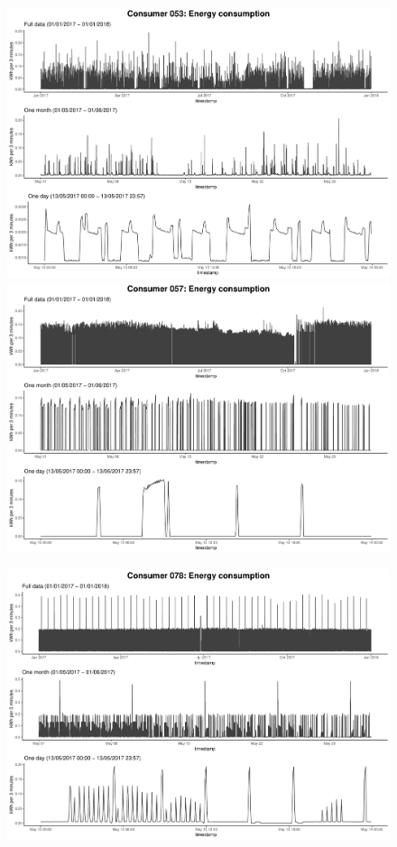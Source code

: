 \begin{centering}
\begin{figure}[!htbp]
\end{figure}
\begin{figure}[!htbp]
        \includegraphics[width=\textwidth-0.85cm]{thesis/graphs/timeseries/c053_cons.pdf}\vspace{0.3cm}
        \includegraphics[width=\textwidth-0.85cm]{thesis/graphs/timeseries/c057_cons.pdf}
\end{figure}
\begin{figure}[!htbp]
        \includegraphics[width=\textwidth-0.85cm]{thesis/graphs/timeseries/c078_cons.pdf}\vspace{0.3cm}

\end{figure}
\end{centering}

